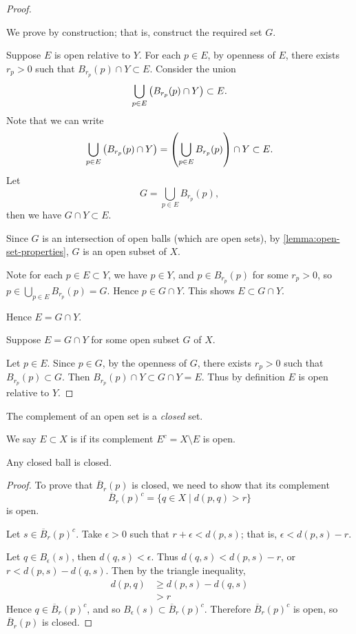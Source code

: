 \begin{proof} \

\forward We prove by construction; that is, construct the required set $G$.

Suppose $E$ is open relative to $Y$. For each $p\in E$, by openness of $E$, there exists $r_p>0$ such that $B_{r_p}(p)\cap Y\subset E$.
Consider the union
\[\bigcup_{p\in E}\left(B_{r_p}(p)\cap Y\right)\subset E.\]
Note that we can write
\[\bigcup_{p\in E}\left(B_{r_p}(p)\cap Y\right)=\left(\bigcup_{p\in E}B_{r_p}(p)\right)\cap Y\subset E.\]
Let
\[G=\bigcup_{p\in E}B_{r_p}(p),\]
then we have $G\cap Y\subset E$. 

Since $G$ is an intersection of open balls (which are open sets), by \ref{lemma:open-set-properties}, $G$ is an open subset of $X$.

Note for each $p\in E\subset Y$, we have $p\in Y$, and $p\in B_{r_p}(p)$ for some $r_p>0$, so $p\in\bigcup_{p\in E}B_{r_p}(p)=G$. Hence $p\in G\cap Y$. This shows $E\subset G\cap Y$.

Hence $E=G\cap Y$.

\backward Suppose $E=G\cap Y$ for some open subset $G$ of $X$. 

Let $p\in E$. Since $p\in G$, by the openness of $G$, there exists $r_p>0$ such that $B_{r_p}(p)\subset G$. Then $B_{r_p}(p)\cap Y\subset G\cap Y=E$. Thus by definition $E$ is open relative to $Y$.
\end{proof}

The complement of an open set is a \emph{closed} set.

\begin{definition}
We say $E\subset X$ is  if its complement $E^c=X\setminus E$ is open.
\end{definition}

\begin{lemma}
Any closed ball is closed.
\end{lemma}

\begin{proof}
To prove that $\overline{B}_r(p)$ is closed, we need to show that its complement
\[\overline{B}_r(p)^c=\{q\in X\mid d(p,q)>r\}\]
is open.

Let $s\in\overline{B}_r(p)^c$. Take $\epsilon>0$ such that $r+\epsilon<d(p,s)$; that is, $\epsilon<d(p,s)-r$.

Let $q\in B_\epsilon(s)$, then $d(q,s)<\epsilon$. Thus $d(q,s)<d(p,s)-r$, or $r<d(p,s)-d(q,s)$. Then by the triangle inequality,
\begin{align*}
d(p,q)&\ge d(p,s)-d(q,s)\\
&>r
\end{align*}
Hence $q\in\overline{B}_r(p)^c$, and so $B_\epsilon(s)\subset\overline{B}_r(p)^c$. Therefore $\overline{B}_r(p)^c$ is open, so $\overline{B}_r(p)$ is closed.
\end{proof}

